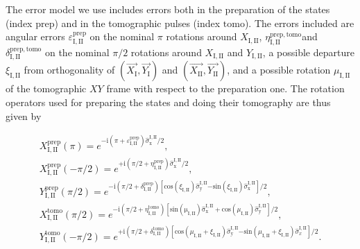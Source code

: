 The error model we use includes errors both in the preparation of the states (index $\mathrm{prep}$) and in
the tomographic pulses (index $\mathrm{tomo}$). The errors included are angular
errors $\varepsilon_{\mathrm{I,II}}^{\mathrm{prep}}$ on the nominal
$\pi$ rotations around $X_{\mathrm{I,II}}$, $\eta_{\mathrm{I,II}}^{\mathrm{prep,tomo}}$and
$\delta_{\mathrm{I,II}}^{\mathrm{prep,tomo}}$ on the nominal $\pi/2$
rotations around $X_{\mathrm{I,II}}$ and $Y_{\mathrm{I,II}}$, a
possible departure $\xi_{\mathrm{I,II}}$ from orthogonality of $\left(\overrightarrow{X_{\mathrm{I}}},\overrightarrow{Y_{\mathrm{I}}}\right)$ and $\left(\overrightarrow{X_{\mathrm{II}}},\overrightarrow{Y_{\mathrm{II}}}\right)$,
and a possible rotation $\mu_{\mathrm{I,II}}$ of the tomographic
$XY$ frame with respect to the preparation one. The rotation operators
used for preparing the states and doing their tomography are thus
given by

\[
\begin{array}{c}
X_{\mathrm{I,II}}^{\mathrm{prep}}(\pi)=e^{-\mathrm{i}\left(\pi+\varepsilon_{\mathrm{I,II}}^{\mathrm{prep}}\right)\hat{\sigma}_{\mathrm{x}}^{\mathrm{I,II}}/2},\\
X_{\mathrm{I,II}}^{\mathrm{prep}}(-\pi/2)=e^{+\mathrm{i}\left(\pi/2+\eta_{\mathrm{I,II}}^{\mathrm{prep}}\right)\hat{\sigma}_{\mathrm{x}}^{\mathrm{I,II}}/2},\\
Y_{\mathrm{I,II}}^{\mathrm{prep}}(\pi/2)=e^{-\mathrm{i}\left(\pi/2+\delta_{\mathrm{I,II}}^{\mathrm{prep}}\right)\left[\mathrm{cos}\left(\xi_{\mathrm{I,II}}\right)\hat{\sigma}_{\mathrm{y}}^{\mathrm{I,II}}\mathrm{-sin}\left(\xi_{\mathrm{I,II}}\right)\hat{\sigma}_{\mathrm{x}}^{\mathrm{I,II}}\right]/2},\\
X_{\mathrm{I,II}}^{\mathrm{tomo}}(\pi/2)=e^{-\mathrm{i}\left(\pi/2+\eta_{\mathrm{I,II}}^{\mathrm{tomo}}\right)\left[\mathrm{\mathrm{sin}\left(\mu_{I,II}\right)\hat{\sigma}_{x}^{I,II}+cos}\left(\mu_{\mathrm{I,II}}\right)\hat{\sigma}_{\mathrm{y}}^{\mathrm{I,II}}\right]/2},\\
Y_{\mathrm{I,II}}^{\mathrm{tomo}}(-\pi/2)=e^{+\mathrm{i}\left(\pi/2+\delta_{\mathrm{I,II}}^{\mathrm{tomo}}\right)\left[\mathrm{cos}\left(\mu_{\mathrm{I,II}}+\xi_{\mathrm{I,II}}\right)\hat{\sigma}_{\mathrm{y}}^{\mathrm{I,II}}\mathrm{-sin}\left(\mu_{\mathrm{I,II}}+\xi_{\mathrm{I,II}}\right)\hat{\sigma}_{x}^{\mathrm{I,II}}\right]/2}.\end{array}\]

